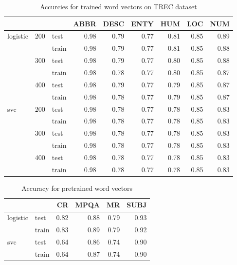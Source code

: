\begin{table}[h]
\begin{center}

\begin{tabular}{lllrrrrrr}
\toprule
 & &&ABBR &DESC &ENTY &HUM &LOC &NUM \\
\midrule
logistic & 200 & test &0.98 &0.79 &0.77 & 0.81 & 0.85 & 0.89 \\
 & & train &0.98 &0.79 &0.77 & 0.81 & 0.85 & 0.88 \\
 & 300 & test &0.98 &0.79 &0.77 & 0.80 & 0.85 & 0.88 \\
 & & train &0.98 &0.78 &0.77 & 0.80 & 0.85 & 0.87 \\
 & 400 & test &0.98 &0.79 &0.77 & 0.79 & 0.85 & 0.87 \\
 & & train &0.98 &0.78 &0.77 & 0.79 & 0.85 & 0.87 \\
svc & 200 & test &0.98 &0.78 &0.77 & 0.78 & 0.85 & 0.83 \\
 & & train &0.98 &0.78 &0.77 & 0.78 & 0.85 & 0.83 \\
 & 300 & test &0.98 &0.78 &0.77 & 0.78 & 0.85 & 0.83 \\
 & & train &0.98 &0.78 &0.77 & 0.78 & 0.85 & 0.83 \\
 & 400 & test &0.98 &0.78 &0.77 & 0.78 & 0.85 & 0.83 \\
 & & train &0.98 &0.78 &0.77 & 0.78 & 0.85 & 0.83 \\
\bottomrule
\end{tabular}

\caption[Accurcies for trained word vectors on TREC dataset]{Accurcies for trained word vectors on TREC dataset}
\label{tab:res:trainedwordvec:trec}
\end{center}
\end{table}



\begin{table}[h]
\begin{center}

\begin{tabular}{llrrrr}
\toprule
 &&CR &MPQA &MR &SUBJ \\
\midrule
logistic & test & 0.82 & 0.88 & 0.79 & 0.93 \\
 & train & 0.83 & 0.89 & 0.79 & 0.92 \\
svc & test & 0.64 & 0.86 & 0.74 & 0.90 \\
 & train & 0.64 & 0.87 & 0.74 & 0.90 \\
\bottomrule
\end{tabular}

\caption[Accuracy for pretrained word vectors]{Accuracy for pretrained word vectors}
\label{tab:}
\end{center}
\end{table}



